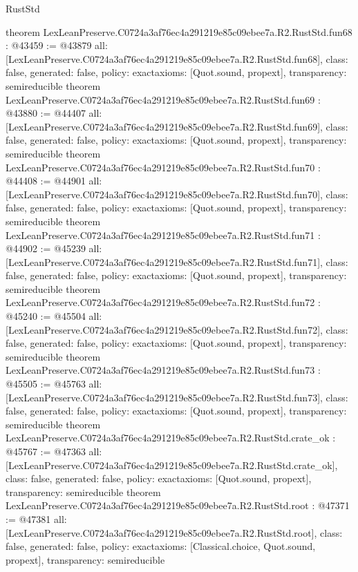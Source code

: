 \begin{lexlean}{RustStd}
\begin{coremodule}
{}
theorem LexLeanPreserve.C0724a3af76ec4a291219e85c09ebee7a.R2.RustStd.fun68 : @43459 := @43879 {
  all: [LexLeanPreserve.C0724a3af76ec4a291219e85c09ebee7a.R2.RustStd.fun68],
  class: false,
  generated: false,
  policy: exact{axioms: [Quot.sound, propext]},
  transparency: semireducible
}
theorem LexLeanPreserve.C0724a3af76ec4a291219e85c09ebee7a.R2.RustStd.fun69 : @43880 := @44407 {
  all: [LexLeanPreserve.C0724a3af76ec4a291219e85c09ebee7a.R2.RustStd.fun69],
  class: false,
  generated: false,
  policy: exact{axioms: [Quot.sound, propext]},
  transparency: semireducible
}
theorem LexLeanPreserve.C0724a3af76ec4a291219e85c09ebee7a.R2.RustStd.fun70 : @44408 := @44901 {
  all: [LexLeanPreserve.C0724a3af76ec4a291219e85c09ebee7a.R2.RustStd.fun70],
  class: false,
  generated: false,
  policy: exact{axioms: [Quot.sound, propext]},
  transparency: semireducible
}
theorem LexLeanPreserve.C0724a3af76ec4a291219e85c09ebee7a.R2.RustStd.fun71 : @44902 := @45239 {
  all: [LexLeanPreserve.C0724a3af76ec4a291219e85c09ebee7a.R2.RustStd.fun71],
  class: false,
  generated: false,
  policy: exact{axioms: [Quot.sound, propext]},
  transparency: semireducible
}
theorem LexLeanPreserve.C0724a3af76ec4a291219e85c09ebee7a.R2.RustStd.fun72 : @45240 := @45504 {
  all: [LexLeanPreserve.C0724a3af76ec4a291219e85c09ebee7a.R2.RustStd.fun72],
  class: false,
  generated: false,
  policy: exact{axioms: [Quot.sound, propext]},
  transparency: semireducible
}
theorem LexLeanPreserve.C0724a3af76ec4a291219e85c09ebee7a.R2.RustStd.fun73 : @45505 := @45763 {
  all: [LexLeanPreserve.C0724a3af76ec4a291219e85c09ebee7a.R2.RustStd.fun73],
  class: false,
  generated: false,
  policy: exact{axioms: [Quot.sound, propext]},
  transparency: semireducible
}
theorem LexLeanPreserve.C0724a3af76ec4a291219e85c09ebee7a.R2.RustStd.crate_ok : @45767 := @47363 {
  all: [LexLeanPreserve.C0724a3af76ec4a291219e85c09ebee7a.R2.RustStd.crate_ok],
  class: false,
  generated: false,
  policy: exact{axioms: [Quot.sound, propext]},
  transparency: semireducible
}
theorem LexLeanPreserve.C0724a3af76ec4a291219e85c09ebee7a.R2.RustStd.root : @47371 := @47381 {
  all: [LexLeanPreserve.C0724a3af76ec4a291219e85c09ebee7a.R2.RustStd.root],
  class: false,
  generated: false,
  policy: exact{axioms: [Classical.choice, Quot.sound, propext]},
  transparency: semireducible
}


\end{coremodule}
\end{lexlean}
